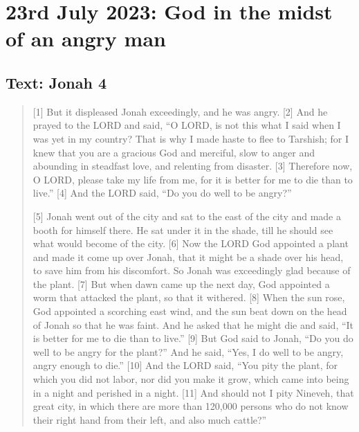\setcounter{figure}{0}

\section{23rd July 2023: God in the midst of an angry man}
\subsection*{Text: Jonah 4}
  \begin{quote}
    [1] But it displeased Jonah exceedingly, and he was angry. [2] And he prayed to the LORD and said, “O LORD, is not this what I said when I was yet in my country? That is why I made haste to flee to Tarshish; for I knew that you are a gracious God and merciful, slow to anger and abounding in steadfast love, and relenting from disaster. [3] Therefore now, O LORD, please take my life from me, for it is better for me to die than to live.” [4] And the LORD said, “Do you do well to be angry?”

    [5] Jonah went out of the city and sat to the east of the city and made a booth for himself there. He sat under it in the shade, till he should see what would become of the city. [6] Now the LORD God appointed a plant and made it come up over Jonah, that it might be a shade over his head, to save him from his discomfort. So Jonah was exceedingly glad because of the plant. [7] But when dawn came up the next day, God appointed a worm that attacked the plant, so that it withered. [8] When the sun rose, God appointed a scorching east wind, and the sun beat down on the head of Jonah so that he was faint. And he asked that he might die and said, “It is better for me to die than to live.” [9] But God said to Jonah, “Do you do well to be angry for the plant?” And he said, “Yes, I do well to be angry, angry enough to die.” [10] And the LORD said, “You pity the plant, for which you did not labor, nor did you make it grow, which came into being in a night and perished in a night. [11] And should not I pity Nineveh, that great city, in which there are more than 120,000 persons who do not know their right hand from their left, and also much cattle?”
  \end{quote}

